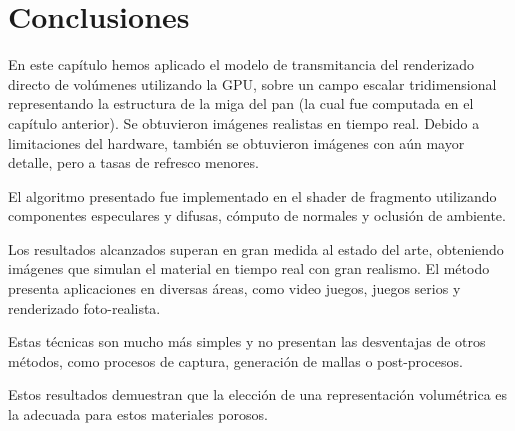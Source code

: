 \section{Conclusiones}

En este capítulo hemos aplicado el modelo de transmitancia del renderizado directo de volúmenes utilizando la GPU, sobre un campo escalar tridimensional representando la estructura de la miga del pan (la cual fue computada en el capítulo anterior).
Se obtuvieron imágenes realistas en tiempo real.
Debido a limitaciones del hardware, también se obtuvieron imágenes con aún mayor detalle, pero a tasas de refresco menores.

El algoritmo presentado fue implementado en el shader de fragmento utilizando componentes especulares y difusas, cómputo de normales y oclusión de ambiente.

Los resultados alcanzados superan en gran medida al estado del arte, obteniendo imágenes que simulan el material en tiempo real con gran realismo.
El método presenta aplicaciones en diversas áreas, como video juegos, juegos serios \cite{Susi2007} y renderizado foto-realista.

Estas técnicas son mucho más simples y no presentan las desventajas de otros métodos, como procesos de captura, generación de mallas o post-procesos.

Estos resultados demuestran que la elección de una representación volumétrica es la adecuada para estos materiales porosos.



